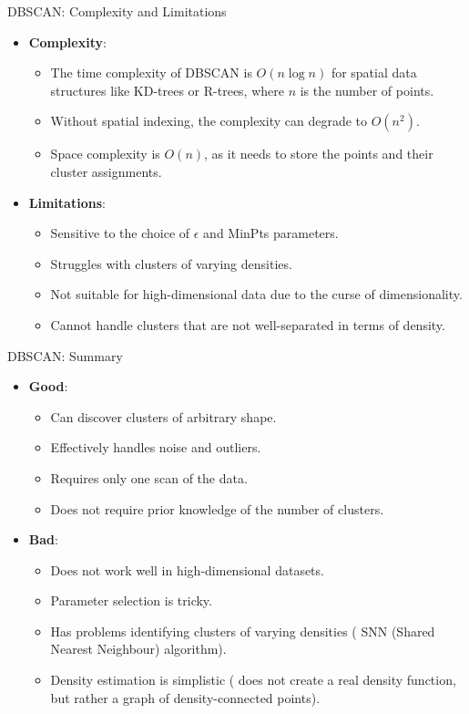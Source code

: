 \begin{frame}[allowframebreaks]{DBSCAN: Complexity and Limitations}
\begin{itemize}
    \item \textbf{Complexity}:
    \begin{itemize}
        \item The time complexity of DBSCAN is $O(n \log n)$ for spatial data structures like KD-trees or R-trees, where $n$ is the number of points.
        \item Without spatial indexing, the complexity can degrade to $O(n^2)$.
        \item Space complexity is $O(n)$, as it needs to store the points and their cluster assignments.
    \end{itemize}
    \item \textbf{Limitations}:
    \begin{itemize}
        \item Sensitive to the choice of $\epsilon$ and MinPts parameters.
        \item Struggles with clusters of varying densities.
        \item Not suitable for high-dimensional data due to the curse of dimensionality.
        \item Cannot handle clusters that are not well-separated in terms of density.
    \end{itemize}
\end{itemize}
\end{frame}


\begin{frame}[allowframebreaks]{DBSCAN: Summary}
\begin{itemize}
    \item \textbf{Good}:
    \begin{itemize}
        \item Can discover clusters of arbitrary shape.
        \item Effectively handles noise and outliers.
        \item Requires only one scan of the data.
        \item Does not require prior knowledge of the number of clusters.
    \end{itemize}
    \item \textbf{Bad}:
    \begin{itemize}
        \item Does not work well in high-dimensional datasets.
        \item Parameter selection is tricky.
        \item Has problems identifying clusters of varying densities (\textrightarrow{} SNN (Shared Nearest Neighbour) algorithm).
        \item Density estimation is simplistic (\textrightarrow{} does not create a real density function, but rather a graph of density-connected points).
    \end{itemize}
\end{itemize}
\end{frame}


